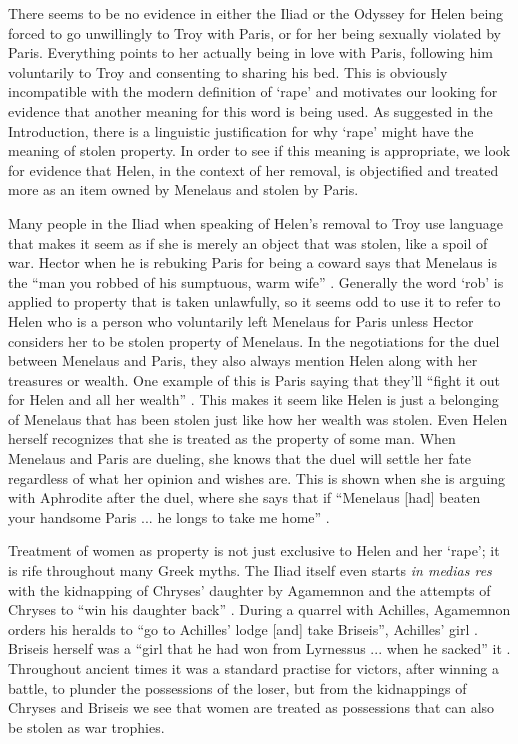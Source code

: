 \documentclass[11pt]{article}
\begin{document}
There seems to be no evidence in either the Iliad or the Odyssey for Helen being forced to go unwillingly to Troy with Paris, or for her being sexually violated by Paris.
Everything points to her actually being in love with Paris, following him voluntarily to Troy and consenting to sharing his bed.
This is obviously incompatible with the modern definition of `rape' and motivates our looking for evidence that another meaning for this word is being used.
As suggested in the Introduction, there is a linguistic justification for why `rape' might have the meaning of stolen property.
In order to see if this meaning is appropriate, we look for evidence that Helen, in the context of her removal, is objectified and treated more as an item owned by Menelaus and stolen by Paris.

Many people in the Iliad when speaking of Helen's removal to Troy use language that makes it seem as if she is merely an object that was stolen, like a spoil of war.
Hector when he is rebuking Paris for being a coward says that Menelaus is the ``man you robbed of his sumptuous, warm wife'' \cite[book 3, line 61]{iliad}.
Generally the word `rob' is applied to property that is taken unlawfully, so it seems odd to use it to refer to Helen who is a person who voluntarily left Menelaus for Paris unless Hector considers her to be stolen property of Menelaus.
In the negotiations for the duel between Menelaus and Paris, they also always mention Helen along with her treasures or wealth.
One example of this is Paris saying that they'll ``fight it out for Helen and all her wealth'' \cite[book 3, line 85]{iliad}.
This makes it seem like Helen is just a belonging of Menelaus that has been stolen just like how her wealth was stolen.
Even Helen herself recognizes that she is treated as the property of some man.
When Menelaus and Paris are dueling, she knows that the duel will settle her fate regardless of what her opinion and wishes are.
This is shown when she is arguing with Aphrodite after the duel, where she says that if ``Menelaus [had] beaten your handsome Paris ... he longs to take me home''  \cite[book 3, line 466]{iliad}.

Treatment of women as property is not just exclusive to Helen and her `rape'; it is rife throughout many Greek myths.
The Iliad itself even starts \emph{in medias res} with the kidnapping of Chryses' daughter by Agamemnon and the attempts of Chryses to ``win his daughter back'' \cite[book 1, line 14]{iliad}.
During a quarrel with Achilles,  Agamemnon orders his heralds to ``go to Achilles' lodge [and] take Briseis'', Achilles' girl \cite[book 1, line 379]{iliad}.
Briseis herself was a ``girl that he had won from Lyrnessus ... when he sacked'' it \cite[book 2, line 690]{iliad-rieu}.
Throughout ancient times it was a standard practise for victors, after winning a battle, to plunder the possessions of the loser, but from the kidnappings of Chryses and Briseis we see that women are treated as possessions that can also be stolen as war trophies.
\end{document}
